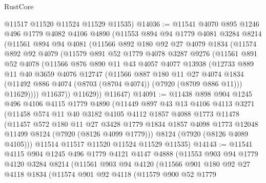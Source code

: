 \begin{lexlean}{RustCore}
\begin{coremodule}
      @11517
      @11520
      @11524
      @11529
      @11535)
@14036 := @11541
    @4070
    @895
    @1246
    @496
    @1779
    @4082
    @4106
    @4890
    (@11553
      @894
      @94
      @1779
      @4081
      @3284
      @8214
      (@11561
        @894
        @94
        @4081
        (@11566
          @892
          @180
          @92
          @27
          @4079
          @1834
          (@11574
            @892
            @92
            @4079
            (@11579
              @891
              @52
              @1779
              @4078
              @3287
              @9276
              (@11561
                @891
                @52
                @4078
                (@11566
                  @876
                  @890
                  @11
                  @43
                  @4057
                  @4077
                  @13938
                  (@12733
                    @889
                    @11
                    @40
                    @3659
                    @4076
                    @12747
                    (@11566
                      @887
                      @180
                      @11
                      @27
                      @4074
                      @1834
                      (@11492 @886 @4074 (@8703 (@8704 @4074)) (@7920 (@8709 @886 @11)))
                      @11629))))
              @11637))
          @11629))
      @11647)
@14091 := @11438
    @898
    @904
    @1245
    @496
    @4106
    @4115
    @1779
    @4890
    (@11449
      @897
      @43
      @13
      @4106
      @4113
      @3271
      (@11458
        @574
        @11
        @40
        @3182
        @4105
        @4112
        @1857
        @4088
        @1773
        @11478
        (@11457
          @572
          @180
          @11
          @27
          @3428
          @1779
          @1834
          @1857
          @4098
          @1773
          @12048
          @11499
          @8124
          (@7920 (@8126 @4099 @1779)))
        @8124
        (@7920 (@8126 @4089 @4105)))
      @11514
      @11517
      @11520
      @11524
      @11529
      @11535)
@14143 := @11541
    @4115
    @904
    @1245
    @496
    @1779
    @4121
    @4147
    @4888
    (@11553
      @903
      @94
      @1779
      @4120
      @3284
      @8214
      (@11561
        @903
        @94
        @4120
        (@11566
          @901
          @180
          @92
          @27
          @4118
          @1834
          (@11574
            @901
            @92
            @4118
            (@11579
              @900
              @52
              @1779

\end{coremodule}
\end{lexlean}
